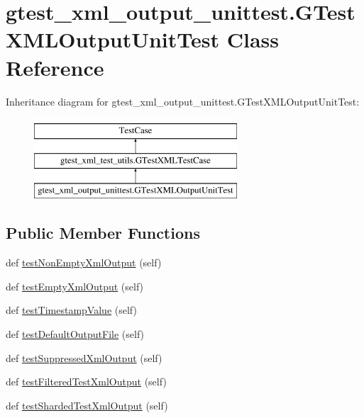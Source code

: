 \hypertarget{classgtest__xml__output__unittest_1_1GTestXMLOutputUnitTest}{}\section{gtest\+\_\+xml\+\_\+output\+\_\+unittest.\+G\+Test\+X\+M\+L\+Output\+Unit\+Test Class Reference}
\label{classgtest__xml__output__unittest_1_1GTestXMLOutputUnitTest}
Inheritance diagram for gtest\+\_\+xml\+\_\+output\+\_\+unittest.\+G\+Test\+X\+M\+L\+Output\+Unit\+Test\+:\begin{figure}[H]
\begin{center}
\leavevmode
\includegraphics[height=3.000000cm]{classgtest__xml__output__unittest_1_1GTestXMLOutputUnitTest}
\end{center}
\end{figure}
\subsection*{Public Member Functions}
\begin{DoxyCompactItemize}
\item 
def \mbox{\hyperlink{classgtest__xml__output__unittest_1_1GTestXMLOutputUnitTest_a310c136c1eb2b421f57651a7d358b17a}{test\+Non\+Empty\+Xml\+Output}} (self)
\item 
def \mbox{\hyperlink{classgtest__xml__output__unittest_1_1GTestXMLOutputUnitTest_a9602f91fe2e9d1e09171a032e94a5619}{test\+Empty\+Xml\+Output}} (self)
\item 
def \mbox{\hyperlink{classgtest__xml__output__unittest_1_1GTestXMLOutputUnitTest_a828521a7ae57f650e1e9ca4beb34336a}{test\+Timestamp\+Value}} (self)
\item 
def \mbox{\hyperlink{classgtest__xml__output__unittest_1_1GTestXMLOutputUnitTest_a01ca66e14468028e5c4eb809987113cf}{test\+Default\+Output\+File}} (self)
\item 
def \mbox{\hyperlink{classgtest__xml__output__unittest_1_1GTestXMLOutputUnitTest_ac6df46d6831892e4c14dbdfae0049618}{test\+Suppressed\+Xml\+Output}} (self)
\item 
def \mbox{\hyperlink{classgtest__xml__output__unittest_1_1GTestXMLOutputUnitTest_a572b6d49e8f4d646ebdadcced3d260ef}{test\+Filtered\+Test\+Xml\+Output}} (self)
\item 
def \mbox{\hyperlink{classgtest__xml__output__unittest_1_1GTestXMLOutputUnitTest_adc6a611bd7c433ecd84876dcb2ac1df1}{test\+Sharded\+Test\+Xml\+Output}} (self)
\end{DoxyCompactItemize}

